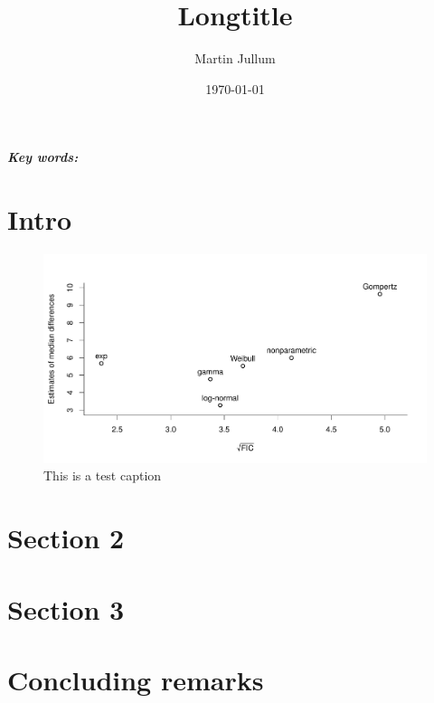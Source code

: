 \documentclass[a4paper,english,11pt,reqno,oneside]{amsart}
\title[Shorttitle]{Longtitle}
\date{\today}
\author{Martin Jullum}
\providecommand{\keywords}[1]{\textbf{\textit{Key words:}} #1}
\theoremstyle{theorem}
\numberwithin{equation}{section}
\numberwithin{figure}{section}
\numberwithin{table}{section}
\begin{document}
\begin{abstract}
\lipsum[10]
\end{abstract}


\maketitle
 
\keywords{}

\section{Intro}
\label{sec:Intro}
\lipsum

\begin{figure}[ht!]
	\centering
		\includegraphics[width=\textwidth]{./figures/testfig.pdf}
	\caption{This is a test caption}
	\label{fig:testfig}
\end{figure}



\section{Section 2}
\label{sec:Sec2}
\lipsum


\section{Section 3}
\label{sec:Sec3}

\lipsum

\section{Concluding remarks}
\label{sec:ConcludingRemarks}
\lipsum


\appendix 
\end{document}
